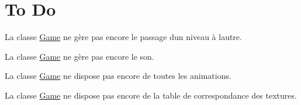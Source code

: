 \hypertarget{index_to_do}{}\section{To Do}\label{index_to_do}

\begin{DoxyItemize}
\item La classe \hyperlink{class_game}{Game} ne gère pas encore le passage d\textquotesingle{}un niveau à l\textquotesingle{}autre.
\item La classe \hyperlink{class_game}{Game} ne gère pas encore le son.
\item La classe \hyperlink{class_game}{Game} ne dispose pas encore de toutes les animations.
\item La classe \hyperlink{class_game}{Game} ne dispose pas encore de la table de correspondance des textures. 
\end{DoxyItemize}